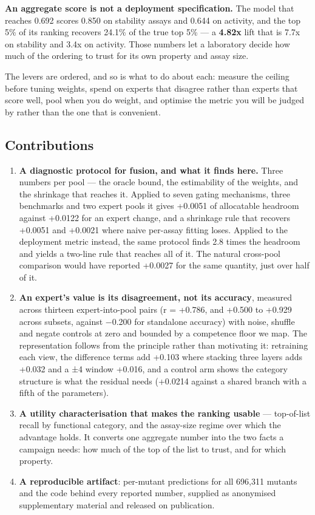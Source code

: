 \documentclass{article}
\providecommand{\tightlist}{\setlength{\itemsep}{0pt}\setlength{\parskip}{0pt}}
\begin{document}
\textbf{An aggregate score is not a deployment specification.} The model that reaches 0.692 scores 0.850 on stability assays and
0.644 on activity, and the top 5\% of its ranking recovers 24.1\% of the true top 5\% --- a \textbf{4.82x} lift that is 7.7x
on stability and 3.4x on activity. Those numbers let a laboratory decide how much of the ordering to
trust for its own property and assay size.

The levers are ordered, and so is what to do about each: measure the ceiling before tuning weights, spend on
experts that disagree rather than experts that score well, pool when you do weight, and optimise the metric you
will be judged by rather than the one that is convenient.

\subsection*{Contributions}\label{contributions}

\begin{enumerate}
\def\labelenumi{\arabic{enumi}.}
\tightlist
\item
  \textbf{A diagnostic protocol for fusion, and what it finds here.} Three numbers per pool --- the oracle bound,
  the estimability of the weights, and the shrinkage that reaches it. Applied to
  seven gating mechanisms, three benchmarks and two expert pools it gives +0.0051 of allocatable headroom
  against +0.0122 for an expert change, and a shrinkage rule that recovers +0.0051 and +0.0021 where naive
  per-assay fitting loses. Applied to the deployment metric instead, the same protocol finds 2.8 times the
  headroom and yields a two-line rule that reaches all of it. The natural cross-pool comparison would have
  reported +0.0027 for the same quantity, just over half of it.
\item
  \textbf{An expert's value is its disagreement, not its accuracy}, measured across thirteen expert-into-pool pairs
  (r = +0.786, and +0.500 to +0.929 across subsets, against −0.200 for standalone accuracy) with noise, shuffle and
  negate controls at zero and bounded by a competence floor we map. The representation follows from the principle rather than motivating it: retraining each view, the difference
  terms add +0.103 where stacking three layers adds +0.032 and a ±4 window +0.016, and a control arm shows the
  category structure is what the residual needs (+0.0214 against a shared branch with a fifth of the parameters).
\item
  \textbf{A utility characterisation that makes the ranking usable} --- top-of-list recall by functional
  category, and the assay-size regime over which the advantage holds. It converts one aggregate number
  into the two facts a campaign needs: how much of the top of the list to trust, and for which property.
\item
  \textbf{A reproducible artifact}: per-mutant predictions for all 696,311 mutants and the code behind every reported
  number, supplied as anonymised supplementary material and released on publication.
\end{enumerate}
\end{document}
